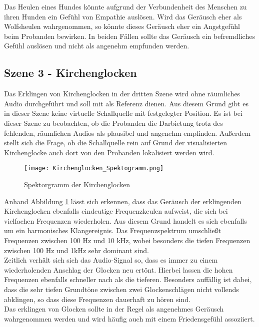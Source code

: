 Das Heulen eines Hundes könnte aufgrund der Verbundenheit des Menschen zu ihren Hunden ein Gefühl von Empathie auslösen. Wird das Geräusch eher als Wolfsheulen wahrgenommen, so könnte dieses Geräusch eher ein Angstgefühl beim Probanden bewirken. In beiden Fällen sollte das Geräusch ein befremdliches Gefühl auslösen und nicht als angenehm empfunden werden. 


\subsection{Szene 3 - Kirchenglocken}
Das Erklingen von Kirchenglocken in der dritten Szene wird ohne räumliches Audio durchgeführt und soll mit als Referenz dienen. Aus diesem Grund gibt es in dieser Szene keine virtuelle Schallquelle mit festgelegter Position. Es ist bei dieser Szene zu beobachten, ob die Probanden die Darbietung trotz des fehlenden, räumlichen Audios als plausibel und angenehm empfinden. Außerdem stellt sich die Frage, ob die Schallquelle rein auf Grund der visualisierten Kirchenglocke auch dort von den Probanden lokalisiert werden wird.
 
    \begin{figure}[H]
\centering
\texttt{[image: Kirchenglocken\_Spektogramm.png]}
\caption{Spektorgramm der Kirchenglocken}
\label{fig:Kirchenglocken_Spektogramm}
\end{figure} 

Anhand Abbildung \ref{fig:Kirchenglocken_Spektogramm} lässt sich erkennen, dass das Geräusch der erklingenden Kirchenglocken ebenfalls eindeutige Frequenzkeulen aufweist, die sich bei vielfachen Frequenzen wiederholen. Aus diesem Grund handelt es sich ebenfalls um ein harmonisches Klangereignis. Das Frequenzspektrum umschließt Frequenzen zwischen 100 Hz und 10 kHz, wobei besonders die tiefen Frequenzen zwischen 100 Hz und 1kHz sehr dominant sind. \\

Zeitlich verhält sich sich das Audio-Signal so, dass es immer zu einem  wiederholenden Anschlag der Glocken neu ertönt. Hierbei lassen die hohen  Frequenzen ebenfalls schneller nach als die tieferen. Besonders auffällig ist dabei, dass die sehr tiefen Grundtöne zwischen zwei Glockenschlägen nicht vollends abklingen, so dass diese Frequenzen dauerhaft zu hören sind.  \\

Das erklingen von Glocken sollte in der Regel als angenehmes Geräusch wahrgenommen werden und wird häufig auch mit einem Friedensgefühl assoziiert. 

